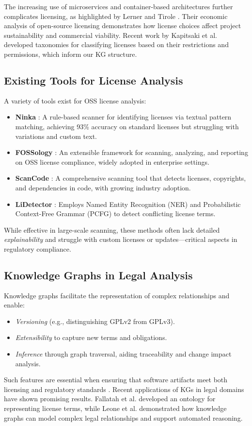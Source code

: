 \documentclass[12pt]{article}
\begin{document}
The increasing use of microservices and container-based architectures further complicates licensing, as highlighted by Lerner and Tirole \cite{lerner2002simple}. Their economic analysis of open-source licensing demonstrates how license choices affect project sustainability and commercial viability. Recent work by Kapitsaki et al. \cite{kapitsaki2017licenses} developed taxonomies for classifying licenses based on their restrictions and permissions, which inform our KG structure.

\subsection{Existing Tools for License Analysis}
A variety of tools exist for OSS license analysis:
\begin{itemize}
    \item \textbf{Ninka} \cite{german2010sentence}: A rule-based scanner for identifying licenses via textual pattern matching, achieving 93\% accuracy on standard licenses but struggling with variations and custom text.
    \item \textbf{FOSSology} \cite{fossology}: An extensible framework for scanning, analyzing, and reporting on OSS license compliance, widely adopted in enterprise settings.
    \item \textbf{ScanCode} \cite{scancode}: A comprehensive scanning tool that detects licenses, copyrights, and dependencies in code, with growing industry adoption.
    \item \textbf{LiDetector} \cite{LiDetectorPaper}: Employs Named Entity Recognition (NER) and Probabilistic Context-Free Grammar (PCFG) to detect conflicting license terms.
\end{itemize}
While effective in large-scale scanning, these methods often lack detailed \emph{explainability} and struggle with custom licenses or updates—critical aspects in regulatory compliance.

\subsection{Knowledge Graphs in Legal Analysis}
Knowledge graphs facilitate the representation of complex relationships and enable:
\begin{itemize}
    \item \emph{Versioning} (e.g., distinguishing GPLv2 from GPLv3).
    \item \emph{Extensibility} to capture new terms and obligations.
    \item \emph{Inference} through graph traversal, aiding traceability and change impact analysis.
\end{itemize}
Such features are essential when ensuring that software artifacts meet both licensing and regulatory standards \cite{KG4Legal}. Recent applications of KGs in legal domains have shown promising results. Fallatah et al. \cite{fallatah2020ontology} developed an ontology for representing license terms, while Leone et al. \cite{leone2020legal} demonstrated how knowledge graphs can model complex legal relationships and support automated reasoning.
\end{document}
